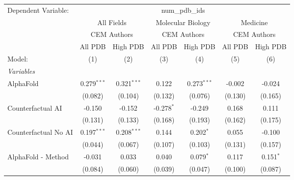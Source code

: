 \begingroup
\centering
\begin{tabular}{lcccccc}
   \tabularnewline \midrule \midrule
   Dependent Variable: & \multicolumn{6}{c}{num\_pdb\_ids}\\
 & \multicolumn{2}{c}{All Fields} & \multicolumn{2}{c}{Molecular Biology} & \multicolumn{2}{c}{Medicine} \\
\cmidrule(lr){2-3} \cmidrule(lr){4-5} \cmidrule(lr){6-7}
 & \multicolumn{2}{c}{CEM Authors} & \multicolumn{2}{c}{CEM Authors} & \multicolumn{2}{c}{CEM Authors} \\
\cmidrule(lr){2-3} \cmidrule(lr){4-5} \cmidrule(lr){6-7}
 & \multicolumn{1}{c}{All PDB} & \multicolumn{1}{c}{High PDB} & \multicolumn{1}{c}{All PDB} & \multicolumn{1}{c}{High PDB} & \multicolumn{1}{c}{All PDB} & \multicolumn{1}{c}{High PDB} \\
\cmidrule(lr){2-2} \cmidrule(lr){3-3} \cmidrule(lr){4-4} \cmidrule(lr){5-5} \cmidrule(lr){6-6} \cmidrule(lr){7-7}
   Model:                                                     & (1)           & (2)           & (3)          & (4)           & (5)     & (6)\\  
   \midrule
   \emph{Variables}\\
   AlphaFold                                                  & 0.279$^{***}$ & 0.321$^{***}$ & 0.122        & 0.273$^{***}$ & -0.002  & -0.024\\   
                                                              & (0.082)       & (0.104)       & (0.132)      & (0.076)       & (0.130) & (0.165)\\   
   Counterfactual AI                                          & -0.150        & -0.152        & -0.278$^{*}$ & -0.249        & 0.168   & 0.111\\   
                                                              & (0.131)       & (0.133)       & (0.168)      & (0.193)       & (0.162) & (0.175)\\   
   Counterfactual No AI                                       & 0.197$^{***}$ & 0.208$^{***}$ & 0.144        & 0.202$^{*}$   & 0.055   & -0.100\\   
                                                              & (0.044)       & (0.067)       & (0.107)      & (0.103)       & (0.131) & (0.157)\\   
   AlphaFold - Method                                         & -0.031        & 0.033         & 0.040        & 0.079$^{*}$   & 0.117   & 0.151$^{*}$\\   
                                                              & (0.084)       & (0.060)       & (0.039)      & (0.047)       & (0.100) & (0.087)\\   

\end{tabular}
